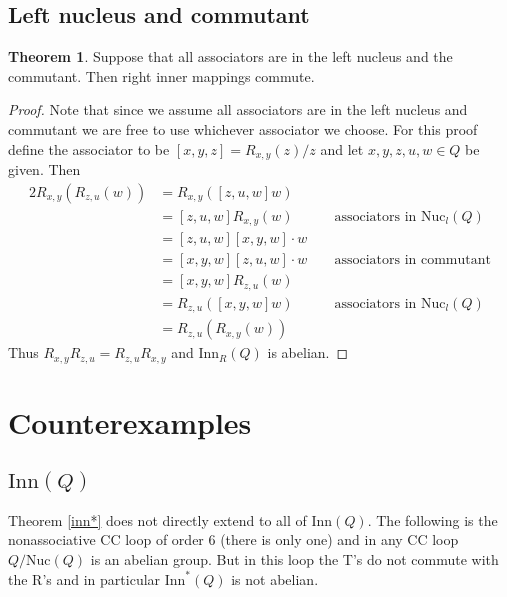 \documentclass[12pt]{report}
\theoremstyle{definition}
\newtheorem{thm}{Theorem}[chapter]
\newcommand{\nuc}{\text{Nuc}}       %
\newcommand{\inn}{\text{Inn}}       %
\begin{document}
\subsection{Left nucleus and commutant}

\begin{thm}
  Suppose that all associators are in the left nucleus and the commutant. Then right inner
    mappings commute.
\end{thm}

\begin{proof}
  Note that since we assume all associators are in the left nucleus and commutant we are free
    to use whichever associator we choose. For this proof define the associator to be
    $[x,y,z] = R_{x,y}(z)/z$ and let $x, y, z, u, w\in Q$ be given. Then
  \begin{alignat*}{2}
    R_{x,y}(R_{z,u}(w)) &= R_{x,y}([z,u,w] w) &&\\
    &= [z,u,w] R_{x,y}(w) &&\text{ associators in $\nuc_l(Q)$}\\
    &= [z,u,w] [x,y,w]\cdot w &&\\
    &= [x,y,w] [z,u,w] \cdot w &&\text{ associators in commutant}\\
    &= [x,y,w] R_{z,u}(w) &&\\
    &= R_{z,u}([x,y,w] w) &&\text{ associators in $\nuc_l(Q)$}\\
    &= R_{z,u}(R_{x,y}(w)) &&
  \end{alignat*}
  Thus $R_{x, y}R_{z, u} = R_{z, u}R_{x, y}$ and $\inn_R(Q)$ is abelian.
\end{proof}



\section{Counterexamples}

\subsection{$\inn(Q)$}
Theorem \ref{inn*} does not directly extend to all of $\inn(Q)$. The following is the nonassociative CC
  loop of order 6 (there is only one) and in any CC loop $Q/\nuc(Q)$ is an abelian group.
  But in this loop the T's do not commute with the R's and in particular $\inn^*(Q)$ is
  not abelian.
\end{document}
